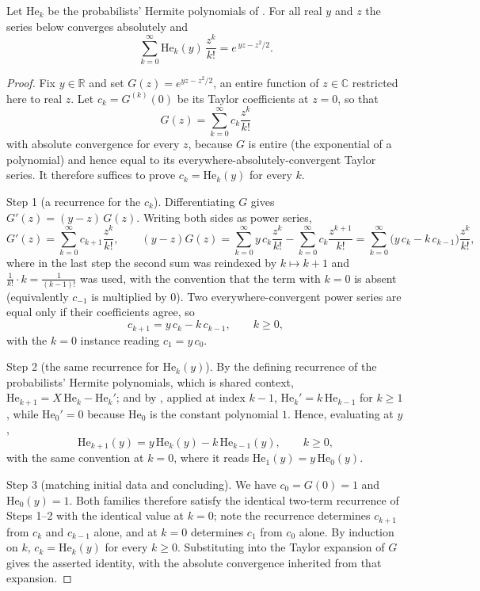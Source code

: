 \begin{lemma}
Let $\mathrm{He}_k$ be the probabilists' Hermite polynomials of
.  For all real $y$ and $z$ the series below converges
absolutely and
\[
  \sum_{k=0}^\infty \mathrm{He}_k(y)\,\frac{z^k}{k!}
    = e^{\,yz - z^2/2} .
\]
\end{lemma}
\begin{proof}
Fix $y \in \mathbb{R}$ and set $G(z) = e^{yz - z^2/2}$, an entire function of
$z \in \mathbb{C}$ restricted here to real $z$.  Let
$c_k = G^{(k)}(0)$ be its Taylor coefficients at $z = 0$, so that
\[
  G(z) = \sum_{k=0}^\infty c_k \frac{z^k}{k!}
\]
with absolute convergence for every $z$, because $G$ is entire (the exponential
of a polynomial) and hence equal to its everywhere-absolutely-convergent Taylor
series.  It therefore suffices to prove $c_k = \mathrm{He}_k(y)$ for every $k$.

Step 1 (a recurrence for the $c_k$).  Differentiating $G$ gives
$G'(z) = (y - z)\,G(z)$.  Writing both sides as power series,
\[
  G'(z) = \sum_{k=0}^\infty c_{k+1}\frac{z^k}{k!},
  \qquad
  (y-z)G(z)
    = \sum_{k=0}^\infty y\,c_k \frac{z^k}{k!}
      - \sum_{k=0}^\infty c_k \frac{z^{k+1}}{k!}
    = \sum_{k=0}^\infty \bigl(y\,c_k - k\,c_{k-1}\bigr)\frac{z^k}{k!},
\]
where in the last step the second sum was reindexed by $k \mapsto k+1$ and
$\frac{1}{k!}\cdot k = \frac{1}{(k-1)!}$ was used, with the convention that the
term with $k = 0$ is absent (equivalently $c_{-1}$ is multiplied by $0$).  Two
everywhere-convergent power series are equal only if their coefficients agree,
so
\[
  c_{k+1} = y\,c_k - k\,c_{k-1}, \qquad k \geq 0,
\]
with the $k=0$ instance reading $c_1 = y\,c_0$.

Step 2 (the same recurrence for $\mathrm{He}_k(y)$).  By the defining recurrence
of the probabilists' Hermite polynomials, which is shared context,
$\mathrm{He}_{k+1} = X\,\mathrm{He}_k - \mathrm{He}_k'$; and by
, applied at index $k-1$,
$\mathrm{He}_k' = k\,\mathrm{He}_{k-1}$ for $k \geq 1$, while
$\mathrm{He}_0' = 0$ because $\mathrm{He}_0$ is the constant polynomial $1$.  Hence,
evaluating at $y$,
\[
  \mathrm{He}_{k+1}(y) = y\,\mathrm{He}_k(y) - k\,\mathrm{He}_{k-1}(y), \qquad k \geq 0,
\]
with the same convention at $k = 0$, where it reads
$\mathrm{He}_1(y) = y\,\mathrm{He}_0(y)$.

Step 3 (matching initial data and concluding).  We have $c_0 = G(0) = 1$ and
$\mathrm{He}_0(y) = 1$.  Both families therefore satisfy the identical two-term
recurrence of Steps 1--2 with the identical value at $k = 0$; note the recurrence
determines $c_{k+1}$ from $c_k$ and $c_{k-1}$ alone, and at $k=0$ determines
$c_1$ from $c_0$ alone.  By induction on $k$, $c_k = \mathrm{He}_k(y)$ for every
$k \geq 0$.  Substituting into the Taylor expansion of $G$ gives the asserted
identity, with the absolute convergence inherited from that expansion.
\end{proof}
